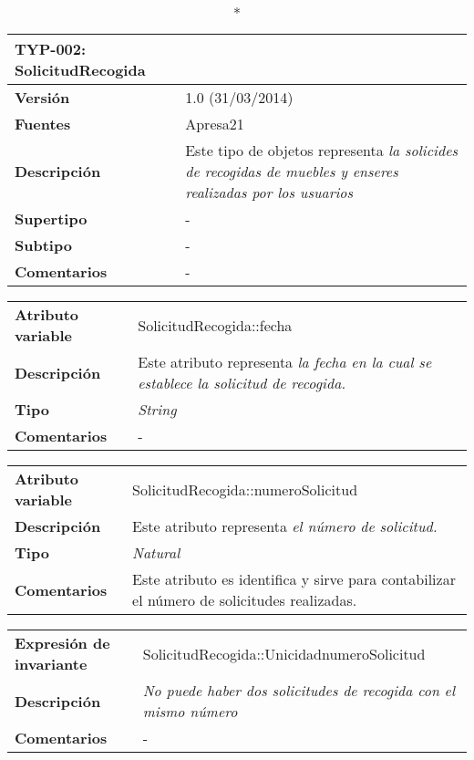 
\begin{longtable}{p{2.5cm}  p{14cm}}
\caption*{\textbf{TYP-002: SolicitudRecogida}} \\
\hline
\textbf{Versión} & 1.0 (31/03/2014) \\
\textbf{Fuentes} & Apresa21 \\
\textbf{Descripción} & Este tipo de objetos representa  \textit{la solicides de recogidas de muebles y enseres realizadas por los usuarios} \\
\textbf{Supertipo} & - \\
\textbf{Subtipo} & -  \\
\textbf{Comentarios} &- \\
\end{longtable}

\begin{longtable}{p{3cm}  p{12cm}}
\hline
\textbf{Atributo variable} & SolicitudRecogida::fecha \\
\textbf{Descripción} & Este atributo representa  \textit{la fecha en la cual se establece la solicitud de recogida.} \\
\textbf{Tipo} & \textit{String} \\
\textbf{Comentarios} & - \\
\end{longtable}

\begin{longtable}{p{3cm}  p{12cm}}
\hline
\textbf{Atributo variable} & SolicitudRecogida::numeroSolicitud \\
\textbf{Descripción} & Este atributo representa  \textit{el número de solicitud.} \\
\textbf{Tipo} & \textit{Natural} \\
\textbf{Comentarios} & Este atributo es identifica y sirve para contabilizar el número de solicitudes realizadas. \\
\end{longtable}

\begin{longtable}{p{3cm}  p{12cm}}
\hline
\textbf{Expresión de invariante} & SolicitudRecogida::UnicidadnumeroSolicitud \\
\textbf{Descripción} &  \textit{No puede haber dos solicitudes de recogida con el mismo número} \\
\textbf{Comentarios} & -\\
\end{longtable}
